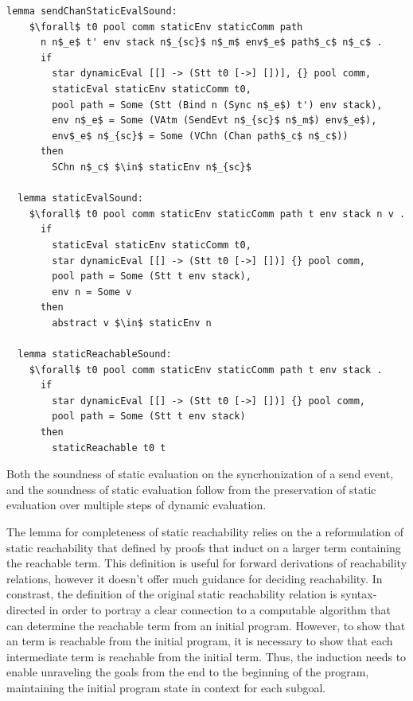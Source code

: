 \documentclass[letterpaper, 11pt]{extarticle}
\begin{document}
\begin{lstlisting}[language=logic, mathescape]
  lemma sendChanStaticEvalSound:
    $\forall$ t0 pool comm staticEnv staticComm path
      n n$_e$ t' env stack n$_{sc}$ n$_m$ env$_e$ path$_c$ n$_c$ .
      if
        star dynamicEval [[] -> (Stt t0 [->] [])], {} pool comm,
        staticEval staticEnv staticComm t0,
        pool path = Some (Stt (Bind n (Sync n$_e$) t') env stack),
        env n$_e$ = Some (VAtm (SendEvt n$_{sc}$ n$_m$) env$_e$),
        env$_e$ n$_{sc}$ = Some (VChn (Chan path$_c$ n$_c$))
      then
        SChn n$_c$ $\in$ staticEnv n$_{sc}$

  lemma staticEvalSound:
    $\forall$ t0 pool comm staticEnv staticComm path t env stack n v .
      if
        staticEval staticEnv staticComm t0, 
        star dynamicEval [[] -> (Stt t0 [->] [])] {} pool comm,
        pool path = Some (Stt t env stack), 
        env n = Some v
      then
        abstract v $\in$ staticEnv n 

  lemma staticReachableSound:
    $\forall$ t0 pool comm staticEnv staticComm path t env stack .
      if
        star dynamicEval [[] -> (Stt t0 [->] [])] {} pool comm,
        pool path = Some (Stt t env stack)
      then
        staticReachable t0 t 
\end{lstlisting}

Both the soundness of static evaluation on the syncrhonization of a send event,
and the soundness of static evaluation follow from
the preservation of static evaluation over multiple steps of dynamic evaluation.

The lemma for completeness of static reachability relies on the a reformulation of
static reachability that defined by proofs that induct on a larger term
containing the reachable term.  This definition is useful for forward derivations
of reachability relations, however it doesn't offer much guidance for deciding reachability. 
In constrast, the definition of the original static reachability relation is
syntax-directed in order to portray a clear connection to
a computable algorithm that can determine the reachable term from an initial program.
However, to show that an term is reachable from the initial program, it is necessary to
show that each intermediate term is reachable from the initial term.  Thus, the
induction needs to enable unraveling the goals from the end to the beginning of the program,
maintaining the initial program state in context for each subgoal.
\end{document}
